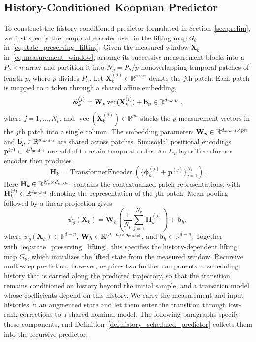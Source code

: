 \documentclass[journal]{IEEEtran}
\theoremstyle{plain}
\theoremstyle{definition}
\newcommand{\vphi}{\boldsymbol{\phi}}
\newcommand{\vp}{\mathbf{p}}
\newcommand{\vb}{\mathbf{b}}
\newcommand{\mH}{\mathbf{H}}
\newcommand{\mW}{\mathbf{W}}
\newcommand{\mX}{\mathbf{X}}
\newcommand{\R}{\mathbb{R}}
\begin{document}
\subsection{History-Conditioned Koopman Predictor}
\label{sec:temporal_lifting}
To construct the history-conditioned predictor formulated in Section~\ref{sec:prelim}, we first specify the temporal encoder used in the lifting map $G_\theta$ in~\eqref{eq:state_preserving_lifting}. Given the measured window $\mX_k$ in~\eqref{eq:measurement_window}, arrange its successive measurement blocks into a $P_h\times n$ array and partition it into $N_p=P_h/p$ nonoverlapping temporal patches of length $p$, where $p$ divides $P_h$. Let $\mX_k^{(j)}\in\R^{p\times n}$ denote the $j$th patch. Each patch is mapped to a token through a shared affine embedding,
\begin{equation}
\vphi_k^{(j)}=\mW_p\operatorname{vec}(\mX_k^{(j)})+\vb_p\in\R^{d_{\rm model}},
\label{eq:patch_embedding}
\end{equation}
where $j=1,\ldots,N_p$, and $\operatorname{vec}(\mX_k^{(j)})\in\R^{pn}$ stacks the $p$ measurement vectors in the $j$th patch into a single column. The embedding parameters $\mW_p\in\R^{d_{\rm model}\times pn}$ and $\vb_p\in\R^{d_{\rm model}}$ are shared across patches. Sinusoidal positional encodings $\vp^{(j)}\in\R^{d_{\rm model}}$ \cite{vaswani2017attention} are added to retain temporal order. An $L_T$-layer Transformer encoder then produces
\begin{equation}
\mH_k=\operatorname{TransformerEncoder}\left(\{\vphi_k^{(j)}+\vp^{(j)}\}_{j=1}^{N_p}\right).
\label{eq:transformer_encoder}
\end{equation}
Here $\mH_k\in\R^{N_p\times d_{\rm model}}$ contains the contextualized patch representations, with $\mH_k^{(j)}\in\R^{d_{\rm model}}$ denoting the representation of the $j$th patch. Mean pooling followed by a linear projection gives
\begin{equation}
\psi_\theta(\mX_k)=\mW_h\left(\frac1{N_p}\sum_{j=1}^{N_p}\mH_k^{(j)}\right)+\vb_h,
\label{eq:history_features}
\end{equation}
where $\psi_\theta(\mX_k)\in\R^{d-n}$, $\mW_h\in\R^{(d-n)\times d_{\rm model}}$, and $\vb_h\in\R^{d-n}$. Together with~\eqref{eq:state_preserving_lifting}, this specifies the history-dependent lifting map $G_\theta$, which initializes the lifted state from the measured window. Recursive multi-step prediction, however, requires two further components: a scheduling history that is carried along the predicted trajectory, so that the transition remains conditioned on history beyond the initial sample, and a transition model whose coefficients depend on this history. We carry the measurement and input histories in an augmented state and let them enter the transition through low-rank corrections to a shared nominal model. The following paragraphs specify these components, and Definition~\ref{def:history_scheduled_predictor} collects them into the recursive predictor.
\end{document}
